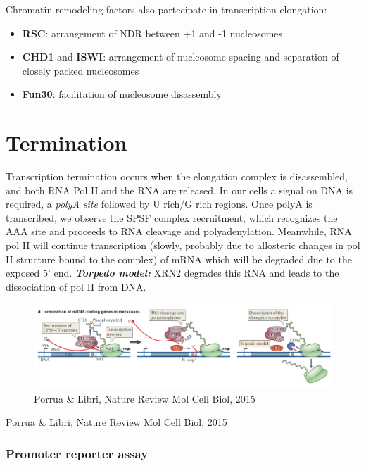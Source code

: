 Chromatin remodeling factors also partecipate in transcription elongation:

\begin{itemize}
\tightlist
\item
  \textbf{RSC}: arrangement of NDR between +1 and -1 nucleosomes
\item
  \textbf{CHD1} and \textbf{ISWI}: arrangement of nucleosome spacing and separation of closely packed nucleosomes
\item
  \textbf{Fun30}: facilitation of nucleosome disassembly
\end{itemize}

\hypertarget{termination}{%
\section{Termination}\label{termination}}

Transcription termination occurs when the elongation complex is disassembled, and both RNA Pol II and the RNA are released. In our cells a signal on DNA is required, a \emph{polyA site} followed by U rich/G rich regions. Once polyA is transcribed, we observe the SPSF complex recruitment, which recognizes the AAA site and proceeds to RNA cleavage and polyadenylation. Meanwhile, RNA pol II will continue transcription (slowly, probably due to allosteric changes in pol II structure bound to the complex) of mRNA which will be degraded due to the exposed 5' end. \textbf{\emph{Torpedo model:}} XRN2 degrades this RNA and leads to the dissociation of pol II from DNA.

\begin{figure}
\centering
\includegraphics[width=\textwidth]{../_resources/Screenshot_2022-10-10_at_10-38-48.png}
\caption{Porrua \& Libri, Nature Review Mol Cell Biol, 2015}
\end{figure}

Porrua \& Libri, Nature Review Mol Cell Biol, 2015

\hypertarget{promoter-reporter-assay}{%
\subsubsection{Promoter reporter assay}\label{promoter-reporter-assay}}

